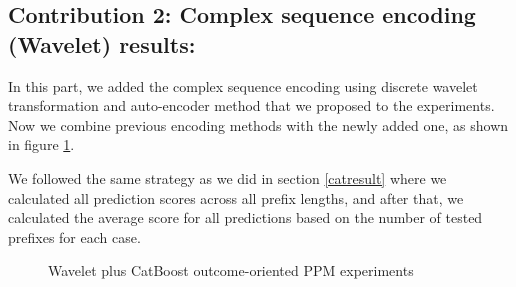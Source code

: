 \clearpage
\subsection{Contribution 2: Complex sequence encoding (Wavelet) results:} \label{wresults}


In this part, we added the complex sequence encoding using discrete wavelet transformation and auto-encoder method that we proposed to the experiments. Now we combine previous encoding methods with the newly added one, as shown in figure \ref{fig:dwt2}. 

We followed the same strategy as we did in section \ref{catresult} where we calculated all prediction scores across all prefix lengths, and after that, we calculated the average score for all predictions based on the number of tested prefixes for each case. 

\begin{figure}[!htb]
	\begin{center}
		\caption{Wavelet plus CatBoost outcome-oriented PPM experiments}
		\label{fig:dwt2}
	\end{center}
\end{figure}


